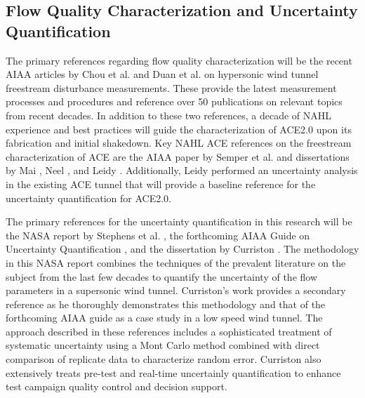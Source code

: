 \subsection{Flow Quality Characterization and Uncertainty Quantification}
The primary references regarding flow quality characterization will be the recent AIAA articles by Chou et al. \cite{chou} and Duan et al. \cite{duan} on hypersonic wind tunnel freestream disturbance measurements. These provide the latest measurement processes and procedures and reference over 50 publications on relevant topics from recent decades. In addition to these two references, a decade of NAHL experience and best practices will guide the characterization of ACE2.0 upon its fabrication and initial shakedown. Key NAHL ACE references on the freestream characterization of ACE are the AIAA paper by Semper et al. \cite{aceturb} and dissertations by Mai \cite{mai-dis}, Neel \cite{neel-dis}, and Leidy \cite{leidy-dis}. Additionally, Leidy performed an uncertainty analysis in the existing ACE tunnel that will provide a baseline reference for the uncertainty quantification for ACE2.0.

The primary references for the uncertainty quantification in this research will be the NASA report by Stephens et al. \cite{stephens-hubbard}, the forthcoming AIAA Guide on Uncertainty Quantification \cite{uq-aiaa}, and the dissertation by Curriston \cite{curriston-dis}. The methodology in this NASA report combines the techniques of the prevalent literature on the subject from the last few decades to quantify the uncertainty of the flow parameters in a supersonic wind tunnel. Curriston's work provides a secondary reference as he thoroughly demonstrates this methodology and that of the forthcoming AIAA guide as a case study in a low speed wind tunnel. The approach described in these references includes a sophisticated treatment of systematic uncertainty using a Mont Carlo method combined with direct comparison of replicate data to characterize random error. Curriston \cite{curriston-dis} also extensively treats pre-test and real-time uncertainly quantification to enhance test campaign quality control and decision support.


